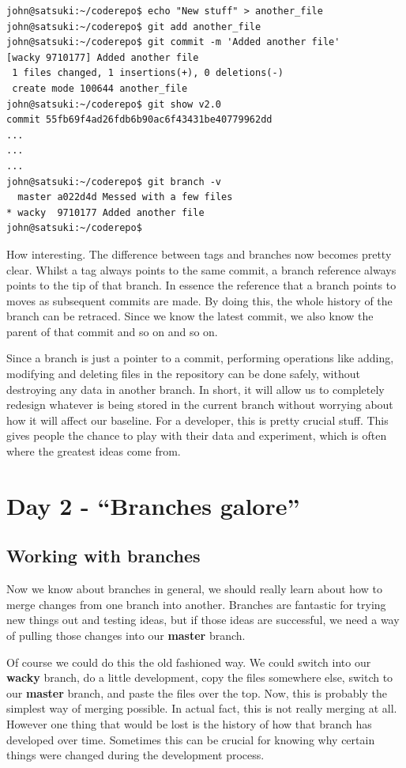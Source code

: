 \begin{Verbatim}
john@satsuki:~/coderepo$ echo "New stuff" > another_file
john@satsuki:~/coderepo$ git add another_file
john@satsuki:~/coderepo$ git commit -m 'Added another file'
[wacky 9710177] Added another file
 1 files changed, 1 insertions(+), 0 deletions(-)
 create mode 100644 another_file
john@satsuki:~/coderepo$ git show v2.0
commit 55fb69f4ad26fdb6b90ac6f43431be40779962dd
...
...
...
john@satsuki:~/coderepo$ git branch -v
  master a022d4d Messed with a few files
* wacky  9710177 Added another file
john@satsuki:~/coderepo$ 
\end{Verbatim}

How interesting.  The difference between tags and branches now becomes pretty clear.  Whilst a tag always points to the same commit, a branch reference always points to the tip of that branch.  In essence the reference that a branch points to moves as subsequent commits are made.  By doing this, the whole history of the branch can be retraced.  Since we know the latest commit, we also know the parent of that commit and so on and so on.

Since a branch is just a pointer to a commit, performing operations like adding, modifying and deleting files in the repository can be done safely, without destroying any data in another branch.  In short, it will allow us to completely redesign whatever is being stored in the current branch without worrying about how it will affect our baseline.  For a developer, this is pretty crucial stuff.  This gives people the chance to play with their data and experiment, which is often where the greatest ideas come from.

\section{Day 2 - ``Branches galore''}
\subsection{Working with branches}

Now we know about branches in general, we should really learn about how to merge changes from one branch into another.  Branches are fantastic for trying new things out and testing ideas, but if those ideas are successful, we need a way of pulling those changes into our \textbf{master} branch.  

Of course we could do this the old fashioned way.  We could switch into our \textbf{wacky} branch, do a little development, copy the files somewhere else, switch to our \textbf{master} branch, and paste the files over the top.  Now, this is probably the simplest way of merging possible.  In actual fact, this is not really merging at all.  However one thing that would be lost is the history of how that branch has developed over time.  Sometimes this can be crucial for knowing why certain things were changed during the development process.

